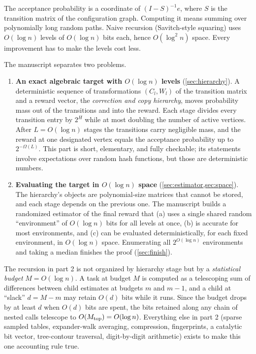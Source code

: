 \documentclass[11pt]{article}
\theoremstyle{definition}
\theoremstyle{remark}
\begin{document}
The acceptance probability is a coordinate of $(I-S)^{-1}e$, where $S$ is the
transition matrix of the configuration graph. Computing it means summing over
polynomially long random paths. Naive recursion (Savitch-style squaring) uses
$O(\log n)$ levels of $O(\log n)$ bits each, hence $O(\log^2n)$ space. Every
improvement has to make the levels cost less.

The manuscript separates two problems.

\begin{enumerate}
\item \textbf{An exact algebraic target with $O(\log n)$ levels} (\cref{sec:hierarchy}).
  A deterministic sequence of transformations $(C_l,W_l)$ of the transition
  matrix and a reward vector, the \emph{correction and copy hierarchy}, moves
  probability mass out of the transitions and into the reward. Each stage divides
  every transition entry by $2^H$ while at most doubling the number of active
  vertices. After $L=O(\log n)$ stages the transitions carry negligible mass, and
  the reward at one designated vertex equals the acceptance probability up to
  $2^{-\Omega(L)}$. This part is short, elementary, and fully checkable; its
  statements involve expectations over random hash functions, but those are
  deterministic numbers.
\item \textbf{Evaluating the target in $O(\log n)$ space}
  (\cref{sec:estimator,sec:space}). The hierarchy's objects are polynomial-size
  matrices that cannot be stored, and each stage depends on the previous one. The
  manuscript builds a randomized estimator of the final reward that (a) uses a
  single shared random ``environment'' of $O(\log n)$ bits for all levels at once,
  (b) is accurate for most environments, and (c) can be evaluated
  deterministically, for each fixed environment, in $O(\log n)$ space. Enumerating
  all $2^{O(\log n)}$ environments and taking a median finishes the proof
  (\cref{sec:finish}).
\end{enumerate}

\begin{idea}
The recursion in part 2 is not organized by hierarchy stage but by a
\emph{statistical budget} $M=O(\log n)$. A task at budget $M$ is computed as a
telescoping sum of differences between child estimates at budgets $m$ and $m-1$,
and a child at ``slack'' $d=M-m$ may retain $O(d)$ bits while it runs. Since the
budget drops by at least $d$ when $O(d)$ bits are spent, the bits retained along
any chain of nested calls telescope to $O(M_{\rm top})=O(\log n)$. Everything
else in part 2 (sparse sampled tables, expander-walk averaging, compression,
fingerprints, a catalytic bit vector, tree-contour traversal, digit-by-digit
arithmetic) exists to make this one accounting rule true.
\end{idea}
\end{document}
